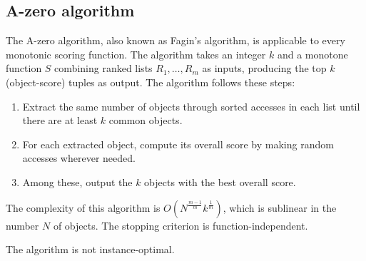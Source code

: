 \subsection{A-zero algorithm}
The A-zero algorithm, also known as Fagin's algorithm, is applicable to every monotonic scoring function. 
The algorithm takes an integer $k$ and a monotone function $S$ combining ranked lists $R_1,\dots,R_m$ as inputs, producing the top $k$ (object-score) tuples as output.
The algorithm follows these steps:
\begin{enumerate}
    \item Extract the same number of objects through sorted accesses in each list until there are at least $k$ common objects.
    \item For each extracted object, compute its overall score by making random accesses wherever needed.
    \item Among these, output the $k$ objects with the best overall score. 
\end{enumerate}
The complexity of this algorithm is $O(N^{\frac{m-1}{m}}k^{\frac{1}{m}})$, which is sublinear in the number $N$ of objects. 
The stopping criterion is function-independent. 
\begin{property}
    The algorithm is not instance-optimal.
\end{property}
